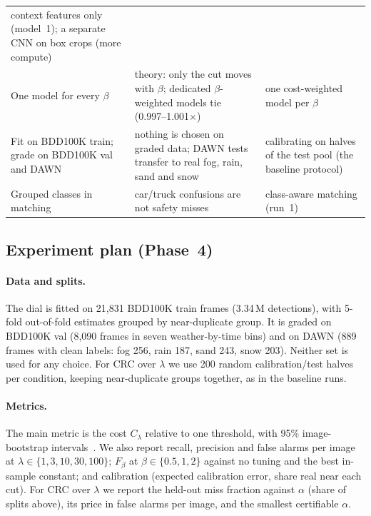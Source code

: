\begin{table}[t]
\begin{tabularx}{\textwidth}{@{}>{\raggedright\arraybackslash}p{2.9cm}>{\raggedright\arraybackslash}X>{\raggedright\arraybackslash}X@{}}
context features only (model~1); a separate CNN on box crops (more compute) \\
One model for every $\beta$ &
theory: only the cut moves with $\beta$; dedicated $\beta$-weighted models tie (0.997--1.001$\times$) &
one cost-weighted model per $\beta$ \\
Fit on BDD100K train; grade on BDD100K val and DAWN &
nothing is chosen on graded data; DAWN tests transfer to real fog, rain, sand and snow &
calibrating on halves of the test pool (the baseline protocol) \\
Grouped classes in matching &
car/truck confusions are not safety misses &
class-aware matching (run~1) \\
\bottomrule
\end{tabularx}
\end{table}

\subsection{Experiment plan (Phase~4)}\label{sec:method-plan}

\paragraph{Data and splits.} The dial is fitted on 21,831 BDD100K train frames (3.34\,M detections), with 5-fold
out-of-fold estimates grouped by near-duplicate group. It is graded on BDD100K val (8,090 frames in seven
weather-by-time bins) and on DAWN (889 frames with clean labels: fog 256, rain 187, sand 243, snow 203).
Neither set is used for any choice. For CRC over $\lambda$ we use 200 random calibration/test halves per
condition, keeping near-duplicate groups together, as in the baseline runs.

\paragraph{Metrics.} The main metric is the cost $C_\lambda$ relative to one threshold, with 95\% image-bootstrap
intervals~\citep{efron1993bootstrap}. We also report recall, precision and false alarms per image at
$\lambda \in \{1, 3, 10, 30, 100\}$; $F_\beta$ at $\beta \in \{0.5, 1, 2\}$ against no tuning and the best
in-sample constant; and calibration (expected calibration error, share real near each cut). For CRC over
$\lambda$ we report the held-out miss fraction against $\alpha$ (share of splits above), its price in false alarms
per image, and the smallest certifiable $\alpha$.

